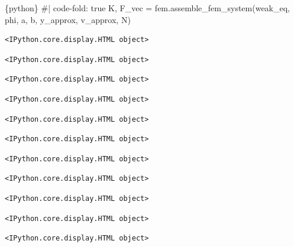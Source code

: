 \documentclass[
  11pt,
  a4paper,
]{scrbook}
\newenvironment{Shaded}{\begin{snugshade}}{\end{snugshade}}
\newcommand{\InformationTok}[1]{\textcolor[rgb]{0.37,0.37,0.37}{#1}}
\begin{document}
\begin{Shaded}
\begin{Highlighting}[]
\InformationTok{\textasciigrave{}\textasciigrave{}\textasciigrave{}\{python\}}
\InformationTok{\#| code{-}fold: true}
\InformationTok{K, F\_vec = fem.assemble\_fem\_system(weak\_eq, phi, a, b, y\_approx, v\_approx, N)}
\InformationTok{\textasciigrave{}\textasciigrave{}\textasciigrave{}}
\end{Highlighting}
\end{Shaded}

\begin{verbatim}
<IPython.core.display.HTML object>
\end{verbatim}

\begin{verbatim}
<IPython.core.display.HTML object>
\end{verbatim}

\begin{verbatim}
<IPython.core.display.HTML object>
\end{verbatim}

\begin{verbatim}
<IPython.core.display.HTML object>
\end{verbatim}

\begin{verbatim}
<IPython.core.display.HTML object>
\end{verbatim}

\begin{verbatim}
<IPython.core.display.HTML object>
\end{verbatim}

\begin{verbatim}
<IPython.core.display.HTML object>
\end{verbatim}

\begin{verbatim}
<IPython.core.display.HTML object>
\end{verbatim}

\begin{verbatim}
<IPython.core.display.HTML object>
\end{verbatim}

\begin{verbatim}
<IPython.core.display.HTML object>
\end{verbatim}

\begin{verbatim}
<IPython.core.display.HTML object>
\end{verbatim}
\end{document}
